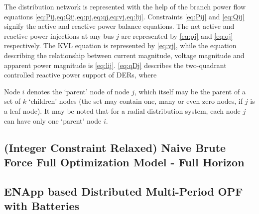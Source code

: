 \documentclass{article}
\begin{document}
The distribution network is represented with the help of the branch power flow equations \cref{eq:Pij,eq:Qij,eq:pj,eq:qj,eq:vj,eq:lij}. Constraints \cref{eq:Pij} and \cref{eq:Qij} signify the active and reactive power balance equations. The net active and reactive power injections at any bus \(j\) are represented by \cref{eq:pj} and \cref{eq:qj} respectively. The KVL equation is represented by \cref{eq:vj}, while the equation describing the relationship between current magnitude, voltage magnitude and apparent power magnitude is \cref{eq:lij}. \cref{eq:qDj} describes the two-quadrant controlled reactive power support of DERs, where   

Node $i$ denotes the `parent' node of node $j$, which itself may be the parent of a set of $k$ `children' nodes (the set may contain one, many or even zero nodes, if $j$ is a leaf node). It may be noted that for a radial distribution system, each node $j$ can have only one `parent' node $i$.

\subsection*{(Integer Constraint Relaxed) Naive Brute Force Full Optimization Model - Full Horizon}



\subsection{ENApp based Distributed Multi-Period OPF with Batteries}
\end{document}
